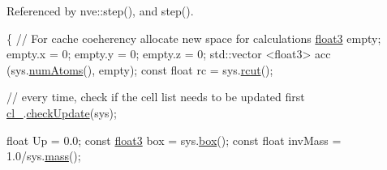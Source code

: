 Referenced by nve\-::step(), and step().


\begin{DoxyCode}
                                                 \{
    \textcolor{comment}{// For cache coeherency allocate new space for calculations}
    \hyperlink{structfloat3}{float3} empty;
    empty.x = 0; empty.y = 0; empty.z = 0;
    std::vector <float3> acc (sys.\hyperlink{classsystem_definition_ae8d3c2df2d56241cee03fcc4e2026ae0}{numAtoms}(), empty);
    \textcolor{keyword}{const} \textcolor{keywordtype}{float} rc = sys.\hyperlink{classsystem_definition_acacd88aac7d451bdcf9779ae8c5a95c7}{rcut}();

    \textcolor{comment}{// every time, check if the cell list needs to be updated first}
    \hyperlink{classintegrator_ad1f7813c9cf3c31898aa7d78fc22232a}{cl\_}.\hyperlink{classcell_list__cpu_a70568e6a2012eb8592f2798b3260c550}{checkUpdate}(sys);

    \textcolor{keywordtype}{float} Up = 0.0;
    \textcolor{keyword}{const} \hyperlink{structfloat3}{float3} box = sys.\hyperlink{classsystem_definition_a85b80dee3609ddb68e370cee3fa959ea}{box}();
    \textcolor{keyword}{const} \textcolor{keywordtype}{float} invMass = 1.0/sys.\hyperlink{classsystem_definition_acb6dd3df121e3e5bc0eb41c32bd937bd}{mass}();
    

\end{DoxyCode}
